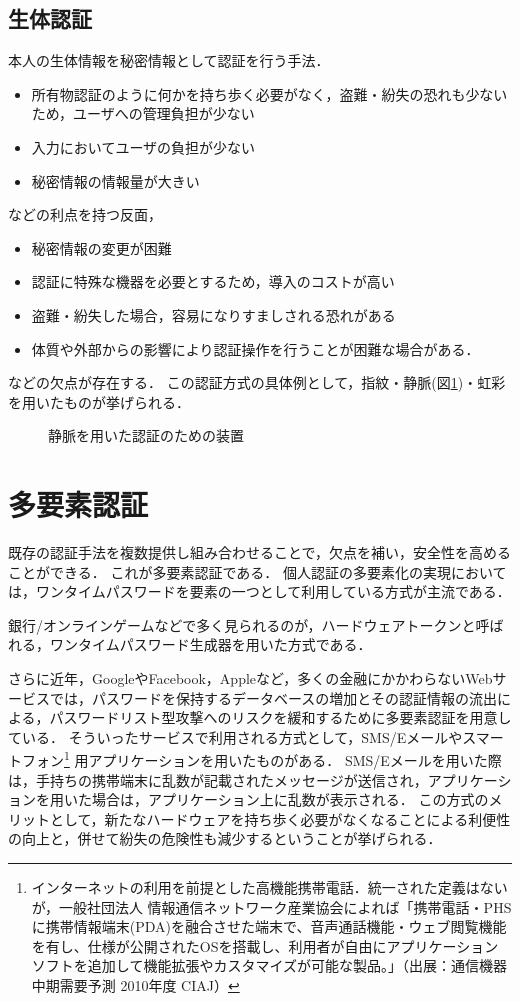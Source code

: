 \subsection{生体認証}\label{subsec:inherence}
本人の生体情報を秘密情報として認証を行う手法．
\begin{itemize}
\item 所有物認証のように何かを持ち歩く必要がなく，盗難・紛失の恐れも少ないため，ユーザへの管理負担が少ない
\item 入力においてユーザの負担が少ない
\item 秘密情報の情報量が大きい
\end{itemize}
などの利点を持つ反面，
\begin{itemize}
\item 秘密情報の変更が困難
\item 認証に特殊な機器を必要とするため，導入のコストが高い
\item 盗難・紛失した場合，容易になりすましされる恐れがある
\item 体質や外部からの影響により認証操作を行うことが困難な場合がある．
\end{itemize}
などの欠点が存在する．
この認証方式の具体例として，指紋・静脈(図\ref{fig:veinAuth})・虹彩を用いたものが挙げられる．

\begin{figure}[th]
\begin{center}
\end{center}
\caption{静脈を用いた認証のための装置}
\label{fig:veinAuth}
\end{figure}

\section{多要素認証}\label{sec:2factor}
既存の認証手法を複数提供し組み合わせることで，欠点を補い，安全性を高めることができる．
これが多要素認証である．
個人認証の多要素化の実現においては，ワンタイムパスワードを要素の一つとして利用している方式が主流である．\cite{arXiv:1309.5344}

銀行/オンラインゲームなどで多く見られるのが，ハードウェアトークンと呼ばれる，ワンタイムパスワード生成器を用いた方式である．

さらに近年，GoogleやFacebook，Appleなど，多くの金融にかかわらないWebサービスでは，パスワードを保持するデータベースの増加とその認証情報の流出による，パスワードリスト型攻撃へのリスクを緩和するために多要素認証を用意している．
そういったサービスで利用される方式として，SMS/Eメールやスマートフォン\footnote{インターネットの利用を前提とした高機能携帯電話．統一された定義はないが，一般社団法人 情報通信ネットワーク産業協会によれば「携帯電話・PHSに携帯情報端末(PDA)を融合させた端末で、音声通話機能・ウェブ閲覧機能を有し、仕様が公開されたOSを搭載し、利用者が自由にアプリケーションソフトを追加して機能拡張やカスタマイズが可能な製品。」（出展：通信機器中期需要予測 2010年度 CIAJ）} 用アプリケーションを用いたものがある．
SMS/Eメールを用いた際は，手持ちの携帯端末に乱数が記載されたメッセージが送信され，アプリケーションを用いた場合は，アプリケーション上に乱数が表示される．
この方式のメリットとして，新たなハードウェアを持ち歩く必要がなくなることによる利便性の向上と，併せて紛失の危険性も減少するということが挙げられる．

